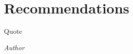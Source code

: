\documentclass[class=report,11pt,crop=false]{standalone}
\begin{document}
\chapter{Recommendations}
\epigraph{Quote}%
    {\emph{Author}}








\ifstandalone

\printnoidxglossary[type=\acronymtype]
\fi
\end{document}
